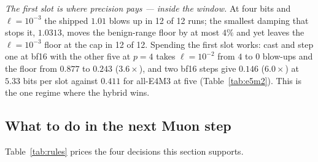 \emph{The first slot is where precision pays --- inside the window.}  At four bits and
$\ell=10^{-3}$ the shipped $1.01$ blows up in 12 of 12 runs; the smallest damping that
stops it, $1.0313$, moves the benign-range floor by at most $4\%$ and yet leaves
the $\ell=10^{-3}$ floor at the cap in 12 of 12.
Spending the first slot works: cast and step one at bf16 with the other five at $p=4$
takes $\ell=10^{-2}$ from $4$ to $0$ blow-ups and the floor from $0.877$ to $0.243$
($3.6\times$), and two bf16 steps give $0.146$ ($6.0\times$) at $5.33$ bits per
slot against $0.411$ for all-E4M3 at five (Table~\ref{tab:e5m2}).  This is the one regime
where the hybrid wins.

\subsection{What to do in the next Muon step}
\label{sec:rules}

Table~\ref{tab:rules} prices the four decisions this section supports.
